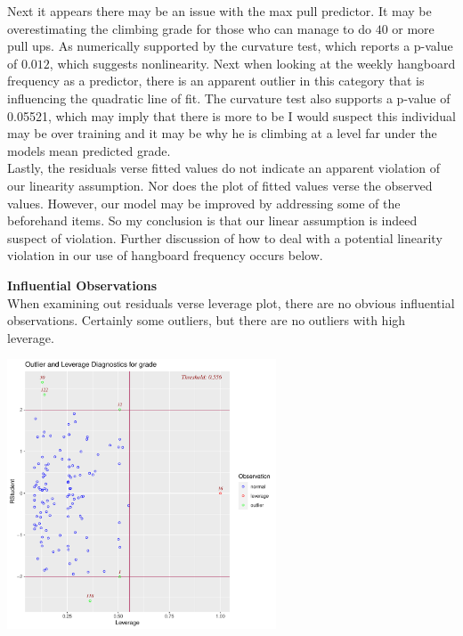 \documentclass[11pt]{amsart}
\begin{document}
Next it appears there may be an issue with the max pull predictor.
It may be overestimating the climbing grade for those who can manage to do $40$ or more pull ups. As numerically supported by the curvature test, which reports a p-value of $0.012$, which suggests nonlinearity. 
Next when looking at the weekly hangboard frequency as a predictor, there is an apparent outlier in this category that is influencing the quadratic line of fit.
The curvature test also supports a p-value of 0.05521, which may imply that there is more to be 
I would suspect this individual may be over training and it may be why he is climbing at a level far under the models mean predicted grade.\\

Lastly, the residuals verse fitted values do not indicate an apparent violation of our linearity assumption.
Nor does the plot of fitted values verse the observed values. 
However, our model may be improved by addressing some of the beforehand items.
So my conclusion is that our linear assumption is indeed suspect of violation.
Further discussion of how to deal with a potential linearity violation in our use of hangboard frequency occurs below.



\vspace{0.3in}
{\bf Influential Observations}\\
When examining out residuals verse leverage plot, there are no obvious influential observations.
Certainly some outliers, but there are no outliers with high leverage.\\

\begin{center}
\includegraphics[width=0.6\textwidth]{5.pdf}
\end{center}
\vspace{0.15in}
\end{document}
